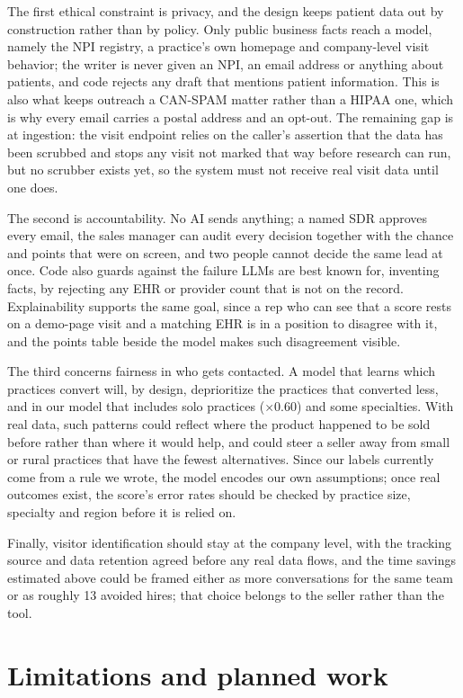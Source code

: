\documentclass[11pt]{article}
\begin{document}
The first ethical constraint is privacy, and the design keeps patient data out by construction rather than by policy. Only public business facts reach a model, namely the NPI registry, a practice's own homepage and company-level visit behavior; the writer is never given an NPI, an email address or anything about patients, and code rejects any draft that mentions patient information. This is also what keeps outreach a CAN-SPAM matter rather than a HIPAA one, which is why every email carries a postal address and an opt-out. The remaining gap is at ingestion: the visit endpoint relies on the caller's assertion that the data has been scrubbed and stops any visit not marked that way before research can run, but no scrubber exists yet, so the system must not receive real visit data until one does.

The second is accountability. No AI sends anything; a named SDR approves every email, the sales manager can audit every decision together with the chance and points that were on screen, and two people cannot decide the same lead at once. Code also guards against the failure LLMs are best known for, inventing facts, by rejecting any EHR or provider count that is not on the record. Explainability supports the same goal, since a rep who can see that a score rests on a demo-page visit and a matching EHR is in a position to disagree with it, and the points table beside the model makes such disagreement visible.

The third concerns fairness in who gets contacted. A model that learns which practices convert will, by design, deprioritize the practices that converted less, and in our model that includes solo practices ($\times$0.60) and some specialties. With real data, such patterns could reflect where the product happened to be sold before rather than where it would help, and could steer a seller away from small or rural practices that have the fewest alternatives. Since our labels currently come from a rule we wrote, the model encodes our own assumptions; once real outcomes exist, the score's error rates should be checked by practice size, specialty and region before it is relied on.

Finally, visitor identification should stay at the company level, with the tracking source and data retention agreed before any real data flows, and the time savings estimated above could be framed either as more conversations for the same team or as roughly 13 avoided hires; that choice belongs to the seller rather than the tool.

\section{Limitations and planned work}
\end{document}
